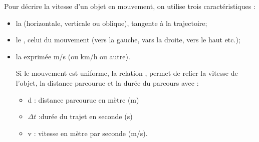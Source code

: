 \begin{mybilan}
	Pour décrire la vitesse d'un objet en mouvement, on utilise trois caractéristiques :
	\begin{itemize}
		\item la  (horizontale, verticale ou oblique), tangente à la trajectoire;
		
		\item le , celui du mouvement (vers la gauche, vars la droite, vers le haut etc.);
		
		\item la  exprimée m/s (ou km/h ou autre).
		
		Si le mouvement est uniforme, la relation , permet de relier la vitesse de l'objet, la distance parcourue et la durée du parcours avec :
		\begin{itemize}
			\item d : distance parcourue en mètre (m)
			\item $\Delta t$ :durée du trajet en seconde (s)
			\item v : vitesse en mètre par seconde (m/s).
		\end{itemize}
	\end{itemize}



\end{mybilan}

